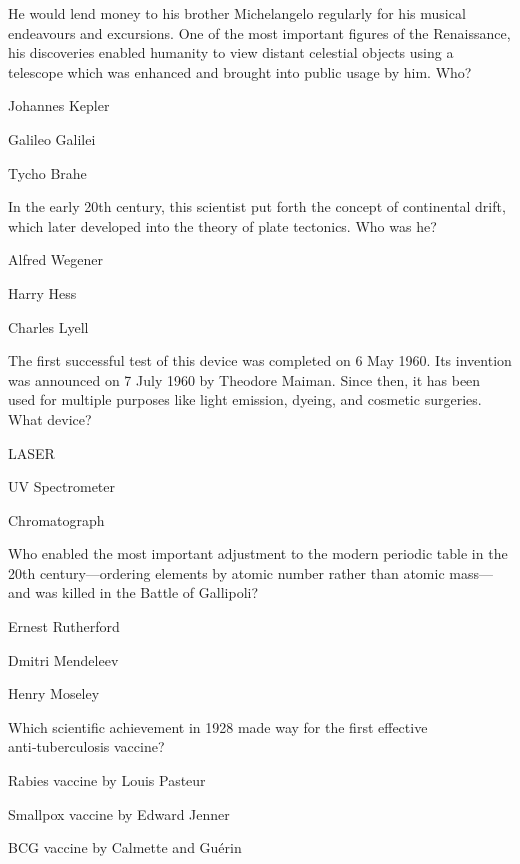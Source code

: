 \begin{enhancedmcq}{He would lend money to his brother Michelangelo regularly for his musical endeavours and excursions. One of the most important figures of the Renaissance, his discoveries enabled humanity to view distant celestial objects using a telescope which was enhanced and brought into public usage by him. Who?}
\item Johannes Kepler
\item Galileo Galilei
\item Tycho Brahe

\end{enhancedmcq}
\begin{enhancedmcq}{In the early 20th century, this scientist put forth the concept of continental drift, which later developed into the theory of plate tectonics. Who was he?}
\item Alfred Wegener
\item Harry Hess
\item Charles Lyell

\end{enhancedmcq}
\begin{enhancedmcq}{The first successful test of this device was completed on 6 May 1960. Its invention was announced on 7 July 1960 by Theodore Maiman. Since then, it has been used for multiple purposes like light emission, dyeing, and cosmetic surgeries. What device?}
\item LASER
\item UV Spectrometer
\item Chromatograph

\end{enhancedmcq}
\begin{enhancedmcq}{Who enabled the most important adjustment to the modern periodic table in the 20th century—ordering elements by atomic number rather than atomic mass—and was killed in the Battle of Gallipoli?}
\item Ernest Rutherford
\item Dmitri Mendeleev
\item Henry Moseley

\end{enhancedmcq}
\begin{enhancedmcq}{Which scientific achievement in 1928 made way for the first effective anti‑tuberculosis vaccine?}
\item Rabies vaccine by Louis Pasteur
\item Smallpox vaccine by Edward Jenner
\item BCG vaccine by Calmette and Guérin

\end{enhancedmcq}
